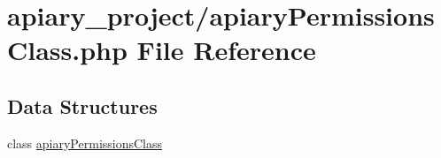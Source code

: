 \hypertarget{apiary_permissions_class_8php}{
\section{apiary_project/apiaryPermissionsClass.php File Reference}
\label{apiary_permissions_class_8php}
}
\subsection*{Data Structures}
\begin{DoxyCompactItemize}
\item 
class \hyperlink{classapiary_permissions_class}{apiaryPermissionsClass}
\end{DoxyCompactItemize}
